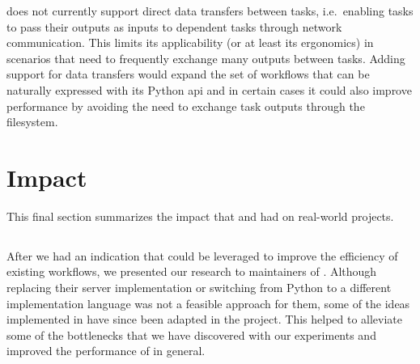 \begin{description}[wide=0pt]
		\hyperqueue{} does not currently support direct data transfers
		between tasks, i.e.\ enabling tasks to pass their outputs as inputs to dependent tasks through
		network communication. This limits its applicability (or at least its ergonomics) in scenarios that
		need to frequently exchange many outputs between tasks. Adding support for data transfers
		would expand the set of workflows that can be naturally expressed with its Python
		\gls{api} and in certain cases it could also improve performance by avoiding the need to
		exchange task outputs through the filesystem.
\end{description}


\clearpage

\section{Impact}
This final section summarizes the impact that \rsds{} and
\hyperqueue{} had on real-world projects.

\vspace{-2mm}\subsection*{\rsds{}}
After we had an indication that \rsds{} could be leveraged to improve the
efficiency of existing \dask{} workflows, we presented our \rsds{} research to maintainers of \dask{}. Although replacing their server implementation or switching from Python
to a different implementation language was not a feasible approach for them, some of the ideas
implemented in \rsds{} have since been adapted in the \dask{}
project. This helped to alleviate some of the bottlenecks that we have discovered with our
experiments and improved the performance of \dask{} in
general.

